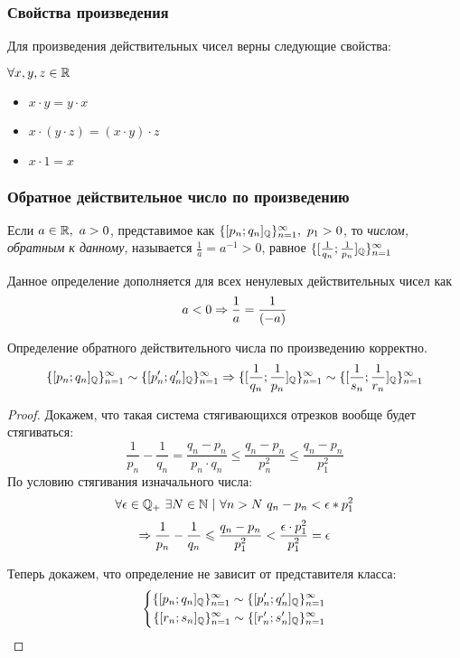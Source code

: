 \subsubsection{Свойства произведения}

Для произведения действительных чисел верны следующие свойства:

$\forall x, y, z \in \mathbb{R}$
\begin{itemize}
    \item $x \cdot y = y \cdot x$
    \item $x \cdot (y \cdot z) = (x \cdot y) \cdot z$
    \item $x \cdot 1 = x$
\end{itemize}

\subsubsection{Обратное действительное число по произведению}

\begin{definition}
    Если $a \in \mathbb{R},\ a > 0$, представимое как $\{[p_n; q_n]_{\mathbb{Q}}\}_{n = 1}^\infty,\ p_1 > 0$, то \textit{числом, обратным к данному}, называется $\frac{1}{a} = a^{-1} > 0$, равное $\{[\frac{1}{q_n};\frac{1}{p_n}]_{\mathbb{Q}}\}_{n = 1}^\infty$
\end{definition}

Данное определение дополняется для всех ненулевых действительных чисел как
$$
    a < 0 \Rightarrow \frac{1}{a} = \frac{1}{(-a)}
$$

\begin{proposition}
    Определение обратного действительного числа по произведению корректно.
    $$
        \{[p_n; q_n]_{\mathbb{Q}}\}_{n = 1}^\infty \sim \{[p'_n; q'_n]_{\mathbb{Q}}\}_{n = 1}^\infty \Rightarrow \{[\frac{1}{q_n}; \frac{1}{p_n}]_{\mathbb{Q}}\}_{n = 1}^\infty \sim \{[\frac{1}{s_n}; \frac{1}{r_n}]_{\mathbb{Q}}\}_{n = 1}^\infty
    $$
\end{proposition}

\begin{proof}
    Докажем, что такая система стягивающихся отрезков вообще будет стягиваться:
    $$
        \frac{1}{p_n} - \frac{1}{q_n} = \frac{q_n - p_n}{p_n \cdot q_n} \le \frac{q_n - p_n}{p^2_n} \le \frac{q_n - p_n}{p^2_1}
    $$
    По условию стягивания изначального числа:
    $$
        \forall \veps \in \Q_+\ \exists N \in \N\ |\ \forall n > N\ q_n - p_n < \veps * p^2_1
    $$
    $$
        \Rightarrow \frac{1}{p_n} - \frac{1}{q_n} \leqslant \frac{q_n - p_n}{p^2_1} < \frac{\epsilon \cdot p^2_1}{p^2_1} = \epsilon
    $$
    
    Теперь докажем, что определение не зависит от представителя класса:
    $$
        \left\{\begin{aligned}\{[p_n; q_n]_{\mathbb{Q}}\}_{n = 1}^\infty \sim \{[p'_n; q'_n]_{\mathbb{Q}}\}_{n = 1}^\infty \\ 
            \{[r_n; s_n]_{\mathbb{Q}}\}_{n = 1}^\infty \sim \{[r'_n; s'_n]_{\mathbb{Q}}\}_{n = 1}^\infty\end{aligned}\right.
    $$
\end{proof}